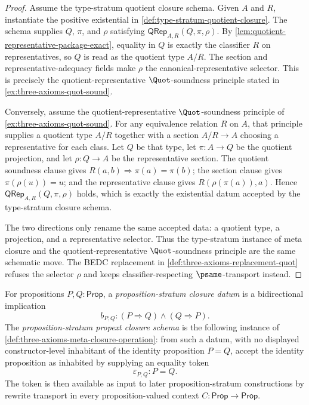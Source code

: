 \begin{proof}
Assume the type-stratum quotient closure schema. Given $A$ and $R$, instantiate the positive existential in \autoref{def:type-stratum-quotient-closure}. The schema supplies $Q$, $\pi$, and $\rho$ satisfying $\mathsf{QRep}_{A,R}(Q,\pi,\rho)$. By \autoref{lem:quotient-representative-package-exact}, equality in $Q$ is exactly the classifier $R$ on representatives, so $Q$ is read as the quotient type $A/R$. The section and representative-adequacy fields make $\rho$ the canonical-representative selector. This is precisely the quotient-representative $\Quot$-soundness principle stated in \autoref{ex:three-axioms-quot-sound}.

Conversely, assume the quotient-representative $\Quot$-soundness principle of \autoref{ex:three-axioms-quot-sound}. For any equivalence relation $R$ on $A$, that principle supplies a quotient type $A/R$ together with a section $A/R\to A$ choosing a representative for each class. Let $Q$ be that type, let $\pi:A\to Q$ be the quotient projection, and let $\rho:Q\to A$ be the representative section. The quotient soundness clause gives $R(a,b)\Longrightarrow \pi(a)=\pi(b)$; the section clause gives $\pi(\rho(u))=u$; and the representative clause gives $R(\rho(\pi(a)),a)$. Hence $\mathsf{QRep}_{A,R}(Q,\pi,\rho)$ holds, which is exactly the existential datum accepted by the type-stratum closure schema.

The two directions only rename the same accepted data: a quotient type, a projection, and a representative selector. Thus the type-stratum instance of meta closure and the quotient-representative $\Quot$-soundness principle are the same schematic move. The BEDC replacement in \autoref{def:three-axioms-replacement-quot} refuses the selector $\rho$ and keeps classifier-respecting $\psame$-transport instead.
\end{proof}

\begin{definition}
\label{def:proposition-stratum-propext-closure}
For propositions $P,Q:\mathsf{Prop}$, a \emph{proposition-stratum closure datum} is a bidirectional implication
$$
b_{P,Q}:(P\Rightarrow Q)\land(Q\Rightarrow P).
$$
The \emph{proposition-stratum propext closure schema} is the following instance of \autoref{def:three-axioms-meta-closure-operation}: from such a datum, with no displayed constructor-level inhabitant of the identity proposition $P=Q$, accept the identity proposition as inhabited by supplying an equality token
$$
\varepsilon_{P,Q}:P=Q.
$$
The token is then available as input to later proposition-stratum constructions by rewrite transport in every proposition-valued context $C:\mathsf{Prop}\to\mathsf{Prop}$.
\end{definition}

